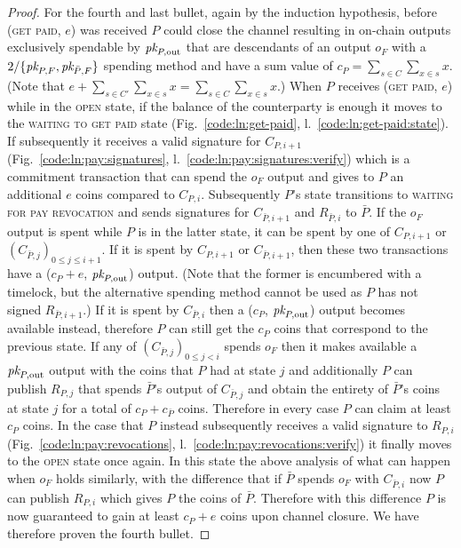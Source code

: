 \begin{proof}
  For the fourth and last bullet, again by the induction hypothesis, before
  (\textsc{get paid}, $e$) was received $P$ could close the channel resulting in
  on-chain outputs exclusively spendable by $\textit{pk}_{P, \mathrm{out}}$ that are
  descendants of an output $o_F$ with a $2/\{\textit{pk}_{P, F}, \textit{pk}_{\bar{P}, F}\}$
  spending method and have a sum value of $c_P = \sum\limits_{s \in C}
  \sum\limits_{x \in s} x$. (Note that $e + \sum\limits_{s \in C'}
  \sum\limits_{x \in s} x = \sum\limits_{s \in C} \sum\limits_{x \in s} x$.)
  When $P$ receives (\textsc{get paid}, $e$) while in the \textsc{open} state,
  if the balance of the counterparty is enough it moves to the \textsc{waiting
  to get paid} state (Fig.~\ref{code:ln:get-paid},
  l.~\ref{code:ln:get-paid:state}). If subsequently it receives a valid
  signature for $C_{P, i+1}$ (Fig.~\ref{code:ln:pay:signatures},
  l.~\ref{code:ln:pay:signatures:verify}) which is a commitment transaction that
  can spend the $o_F$ output and gives to $P$ an additional $e$ coins compared
  to $C_{P, i}$. Subsequently $P$'s state transitions to \textsc{waiting for pay
  revocation} and sends signatures for $C_{\bar{P}, i+1}$ and $R_{\bar{P}, i}$
  to $\bar{P}$. If the $o_F$ output is spent while $P$ is in the latter state,
  it can be spent by one of $C_{P, i+1}$ or $(C_{\bar{P}, j})_{0 \leq j \leq
  i+1}$. If it is spent by $C_{P, i+1}$ or $C_{\bar{P}, i+1}$, then these two
  transactions have a ($c_P + e$, $\textit{pk}_{P, \mathrm{out}}$) output. (Note that the
  former is encumbered with a timelock, but the alternative spending method
  cannot be used as $P$ has not signed $R_{\bar{P}, i+1}$.) If it is spent by
  $C_{\bar{P}, i}$ then a ($c_P$, $\textit{pk}_{P, \mathrm{out}}$) output becomes
  available instead, therefore $P$ can still get the $c_P$ coins that correspond
  to the previous state. If any of $(C_{\bar{P}, j})_{0 \leq j < i}$ spends
  $o_F$ then it makes available a $\textit{pk}_{P, \mathrm{out}}$ output with the coins
  that $P$ had at state $j$ and additionally $P$ can publish $R_{P, j}$ that
  spends $\bar{P}$'s output of $C_{\bar{P}, j}$ and obtain the entirety of
  $\bar{P}$'s coins at state $j$ for a total of $c_P + c_{\bar{P}}$ coins.
  Therefore in every case $P$ can claim at least $c_P$ coins. In the case that
  $P$ instead subsequently receives a valid signature to $R_{P, i}$
  (Fig.~\ref{code:ln:pay:revocations}, l.~\ref{code:ln:pay:revocations:verify})
  it finally moves to the \textsc{open} state once again. In this state the
  above analysis of what can happen when $o_F$ holds similarly, with the
  difference that if $\bar{P}$ spends $o_F$ with $C_{\bar{P}, i}$ now $P$ can
  publish $R_{P, i}$ which gives $P$ the coins of $\bar{P}$. Therefore with this
  difference $P$ is now guaranteed to gain at least $c_P + e$ coins upon channel
  closure. We have therefore proven the fourth bullet.
\end{proof}
